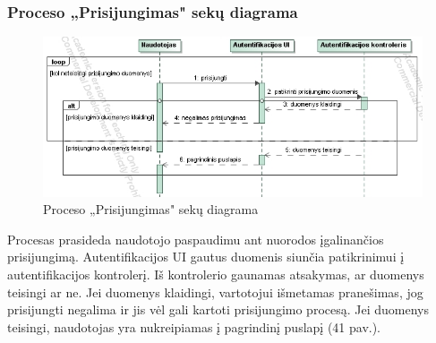 \documentclass{VUMIFPSkursinis}
\begin{document}
\subsubsection{Proceso „Prisijungimas" sekų diagrama}
\begin{figure}[H]
\centering
\includegraphics[width=\linewidth, frame]{img/proceso(prisijungimas).png}
\caption{Proceso „Prisijungimas" sekų diagrama}
\end{figure}
Procesas prasideda naudotojo paspaudimu ant nuorodos įgalinančios prisijungimą. Autentifikacijos UI gautus duomenis siunčia patikrinimui į autentifikacijos kontrolerį. Iš kontrolerio gaunamas atsakymas, ar duomenys teisingi ar ne. Jei duomenys klaidingi, vartotojui išmetamas pranešimas, jog prisijungti negalima ir jis vėl gali kartoti prisijungimo procesą. Jei duomenys teisingi, naudotojas yra nukreipiamas į pagrindinį puslapį (41 pav.).
\end{document}
